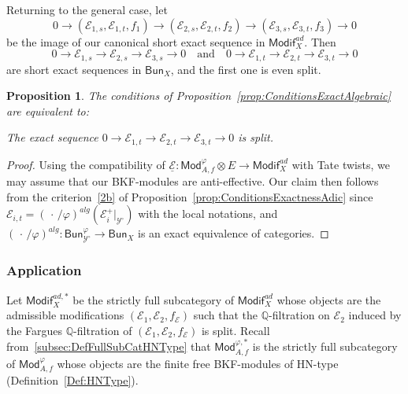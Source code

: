 \documentclass[11pt]{article}
\newtheorem{prop}[theo]{Proposition}
\theoremstyle{definition}
\numberwithin{equation}{section}
\numberwithin{figure}{section}
\numberwithin{table}{section}
\newcommand{\Mod}{\mathsf{Mod}}
\newcommand{\Modif}{\mathsf{Modif}}
\newcommand{\Bun}{\mathsf{Bun}}
\begin{document}
Returning to the general case, let
\[
0\rightarrow(\mathcal{E}_{1,s},\mathcal{E}_{1,t},f_{1})\rightarrow(\mathcal{E}_{2,s},\mathcal{E}_{2,t},f_{2})\rightarrow(\mathcal{E}_{3,s},\mathcal{E}_{3,t},f_{3})\rightarrow0
\]
be the image of our canonical short exact sequence in $\Modif_{X}^{ad}$. Then
\[
0\rightarrow\mathcal{E}_{1,s}\rightarrow\mathcal{E}_{2,s}\rightarrow\mathcal{E}_{3,s}\rightarrow0\quad\text{and}\quad0\rightarrow\mathcal{E}_{1,t}\rightarrow\mathcal{E}_{2,t}\rightarrow\mathcal{E}_{3,t}\rightarrow0
\]
are short exact sequences in $\Bun_{X}$, and the first one is even split.

\begin{prop}\label{prop:CritExactOnModif}
The conditions of Proposition~\ref{prop:ConditionsExactAlgebraic} are equivalent to:

The exact sequence $0\rightarrow\mathcal{E}_{1,t}\rightarrow\mathcal{E}_{2,t}\rightarrow\mathcal{E}_{3,t}\rightarrow0$ is split.
\end{prop}

\begin{proof}
Using the compatibility of $\underline{\mathcal{E}}:\Mod_{A,f}^{\varphi}\otimes E\rightarrow\Modif_{X}^{ad}$ with Tate twists, we may assume that our BKF-modules are anti-effective. Our claim then follows from the criterion~\eqref{2b} of Proposition~\ref{prop:ConditionsExactnessAdic} since $\mathcal{E}_{i,t}=({\,\cdot\,}/\varphi)^{alg}(\mathscr{E}_{i}^{+}\vert_{\mathscr{Y}^{\circ}})$ with the local notations, and $({\,\cdot\,}/\varphi)^{alg}:\Bun_{\mathscr{Y}^{\circ}}^{\varphi}\rightarrow\Bun_{X}$ is an exact equivalence of categories.
\end{proof}

\subsubsection{Application}

Let $\Modif_{X}^{ad,\ast}$ be the strictly full subcategory of $\Modif_{X}^{ad}$ whose objects are the admissible modifications $(\mathcal{E}_{1},\mathcal{E}_{2},f_{\mathcal{E}})$ such that the $\mathbb{Q}$-filtration on $\mathcal{E}_{2}$ induced by the Fargues $\mathbb{Q}$-filtration of $(\mathcal{E}_{1},\mathcal{E}_{2},f_{\mathcal{E}})$ is split. Recall from~\ref{subsec:DefFullSubCatHNType} that $\Mod_{A,f}^{\varphi,\ast}$ is the strictly full subcategory of $\Mod_{A,f}^{\varphi}$ whose objects are the finite free BKF-modules of HN-type (Definition~\ref{Def:HNType}).
\end{document}
